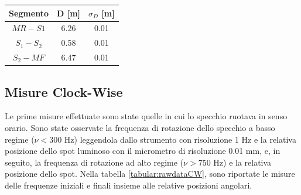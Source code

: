 \documentclass{article}
\begin{document}
            \begin{table}[H]

                \centering

                \begin{tabular}{ c c c } 
                        
                    \toprule
                    \textbf{Segmento} & D [m] & $\sigma_D$ [m] \\ 

                    \midrule
                        $MR-S1$     &   6.26    & 0.01  \\ 
                        $S_1-S_2$   &   0.58    & 0.01  \\ 
                        $S_2-MF$    &   6.47    & 0.01  \\ 
                    \bottomrule                

                \end{tabular}

                \label{tabular:distanze}

            \end{table}
        

        \subsection{Misure Clock-Wise}
            
            Le prime misure effettuate sono state quelle in cui lo specchio ruotava in senso orario. 
            Sono state osservate la frequenza di rotazione dello specchio a basso regime ($\nu < 300 $ Hz) leggendola dallo strumento con risoluzione 1 Hz e 
            la relativa posizione dello spot luminoso con il micrometro di risoluzione 0.01 mm, e, in seguito, 
            la frequenza di rotazione ad alto regime ($\nu > 750 $ Hz) e la relativa posizione dello spot. 
            Nella tabella \ref{tabular:rawdataCW}, sono riportate le misure delle frequenze iniziali e finali insieme alle relative posizioni angolari. \\
\end{document}
